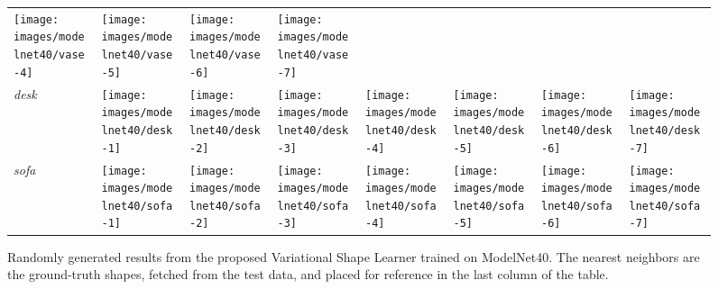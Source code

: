 \documentclass[10pt,twocolumn,letterpaper]{article}
\begin{document}
\begin{figure*}[ht!]
\begin{tabular}{C{0.08\textwidth}|m{0.1\textwidth}m{0.1\textwidth}m{0.1\textwidth}m{0.1\textwidth}m{0.1\textwidth}m{0.1\textwidth} | m{0.1\textwidth}}
     \texttt{[image: images/modelnet40/vase-4]}   &
     \texttt{[image: images/modelnet40/vase-5]}   &
     \texttt{[image: images/modelnet40/vase-6]}   &
     \texttt{[image: images/modelnet40/vase-7]}\\
    {\it desk}  &
     \texttt{[image: images/modelnet40/desk-1]}    &
     \texttt{[image: images/modelnet40/desk-2]}    &
     \texttt{[image: images/modelnet40/desk-3]}    &
     \texttt{[image: images/modelnet40/desk-4]}    &
     \texttt{[image: images/modelnet40/desk-5]}    &
     \texttt{[image: images/modelnet40/desk-6]}    &
     \texttt{[image: images/modelnet40/desk-7]}\\
    {\it sofa}  &
    \texttt{[image: images/modelnet40/sofa-1]}   &
    \texttt{[image: images/modelnet40/sofa-2]}   &
    \texttt{[image: images/modelnet40/sofa-3]}   &
    \texttt{[image: images/modelnet40/sofa-4]}   &
    \texttt{[image: images/modelnet40/sofa-5]}   &
    \texttt{[image: images/modelnet40/sofa-6]}  &
    \texttt{[image: images/modelnet40/sofa-7]}
    \end{tabular}
    \caption{Randomly generated results from the proposed Variational Shape Learner trained on ModelNet40. The nearest neighbors are the ground-truth shapes, fetched from the test data, and placed for reference in the last column of the table. }
    \label{fig:shapegen}
\end{figure*}
\end{document}
